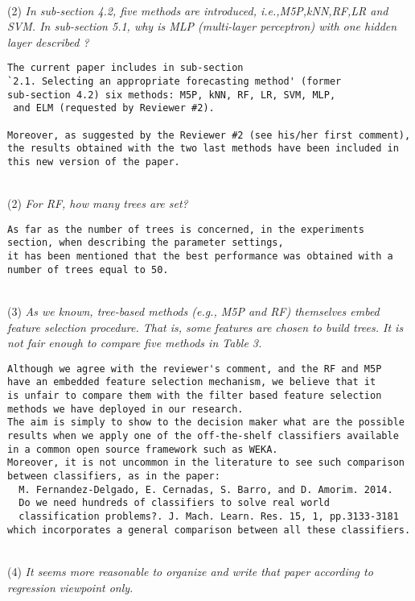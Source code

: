\documentclass[preprint]{elsarticle}
\begin{document}
~\\
\noindent (2) \emph{In sub-section 4.2, five methods are introduced, i.e.,M5P,kNN,RF,LR and SVM. In sub-section 5.1, why is MLP (multi-layer perceptron) with one hidden layer described ?} 

\begin{verbatim}
The current paper includes in sub-section 
`2.1. Selecting an appropriate forecasting method' (former
sub-section 4.2) six methods: M5P, kNN, RF, LR, SVM, MLP,
 and ELM (requested by Reviewer #2).

Moreover, as suggested by the Reviewer #2 (see his/her first comment), 
the results obtained with the two last methods have been included in 
this new version of the paper.
\end{verbatim}

~\\
\noindent (2) \emph{For RF, how many trees are set? }

\begin{verbatim}
As far as the number of trees is concerned, in the experiments 
section, when describing the parameter settings, 
it has been mentioned that the best performance was obtained with a 
number of trees equal to 50.
\end{verbatim}


~\\
\noindent (3) \emph{As we known, tree-based methods (e.g., M5P and RF) themselves embed feature selection procedure. That is, some features are chosen to build trees. It is not fair enough to compare five methods in Table 3. } 

\begin{verbatim}
Although we agree with the reviewer's comment, and the RF and M5P 
have an embedded feature selection mechanism, we believe that it 
is unfair to compare them with the filter based feature selection 
methods we have deployed in our research. 
The aim is simply to show to the decision maker what are the possible 
results when we apply one of the off-the-shelf classifiers available 
in a common open source framework such as WEKA. 
Moreover, it is not uncommon in the literature to see such comparison 
between classifiers, as in the paper:
  M. Fernandez-Delgado, E. Cernadas, S. Barro, and D. Amorim. 2014. 
  Do we need hundreds of classifiers to solve real world 
  classification problems?. J. Mach. Learn. Res. 15, 1, pp.3133-3181
which incorporates a general comparison between all these classifiers.
\end{verbatim}
~\\
\noindent (4) \emph{It seems more reasonable to organize and write that paper according to regression viewpoint only. } 
\end{document}
